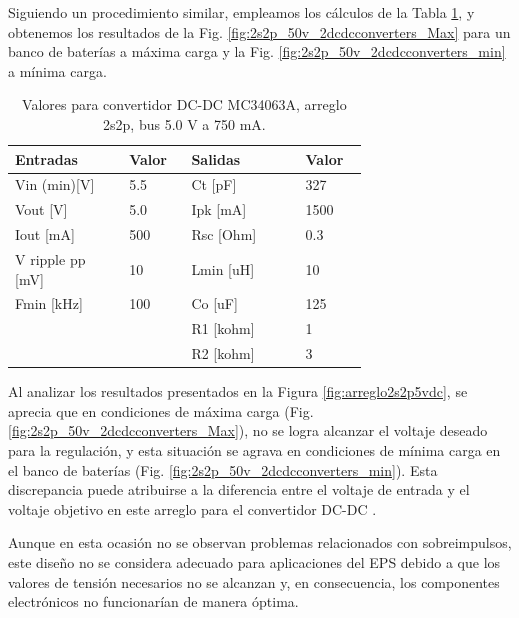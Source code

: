 
Siguiendo un procedimiento similar, empleamos los cálculos de la Tabla \ref{tab:valores_50_2s2p}, y obtenemos los resultados de la Fig. \ref{fig:2s2p_50v_2dcdcconverters_Max} para un banco de baterías a máxima carga y la Fig. \ref{fig:2s2p_50v_2dcdcconverters_min} a mínima carga.

\begin{table}[h]
    \centering
    \begin{tabular}{p{0.25\linewidth}p{0.1\linewidth}p{0.25\linewidth}p{0.1\linewidth}}
    \hline
    \textbf{Entradas} & \textbf{Valor} & \textbf{Salidas} & \textbf{Valor} \\ \hline
    Vin (min)[V] & 5.5 & Ct [pF] & 327 \\
    Vout [V] & 5.0 & Ipk [mA] & 1500 \\
    Iout [mA] & 500 & Rsc [Ohm] & 0.3 \\
    V ripple pp [mV] & 10 & Lmin [uH] & 10 \\
    Fmin [kHz] & 100 & Co [uF] & 125 \\
    ~ & ~ & R1 [kohm] & 1 \\
    ~ & ~ & R2 [kohm] & 3 \\ \hline
    \end{tabular}
\caption{Valores para convertidor DC-DC MC34063A, arreglo 2s2p, bus 5.0 V a 750 mA.}
\label{tab:valores_50_2s2p}
\end{table}

Al analizar los resultados presentados en la Figura \ref{fig:arreglo2s2p5vdc}, se aprecia que en condiciones de máxima carga (Fig. \ref{fig:2s2p_50v_2dcdcconverters_Max}), no se logra alcanzar el voltaje deseado para la regulación, y esta situación se agrava en condiciones de mínima carga en el banco de baterías (Fig. \ref{fig:2s2p_50v_2dcdcconverters_min}). Esta discrepancia puede atribuirse a la diferencia entre el voltaje de entrada y el voltaje objetivo en este arreglo para el convertidor DC-DC .

Aunque en esta ocasión no se observan problemas relacionados con sobreimpulsos, este diseño no se considera adecuado para aplicaciones del EPS debido a que los valores de tensión necesarios no se alcanzan y, en consecuencia, los componentes electrónicos no funcionarían de manera óptima.


